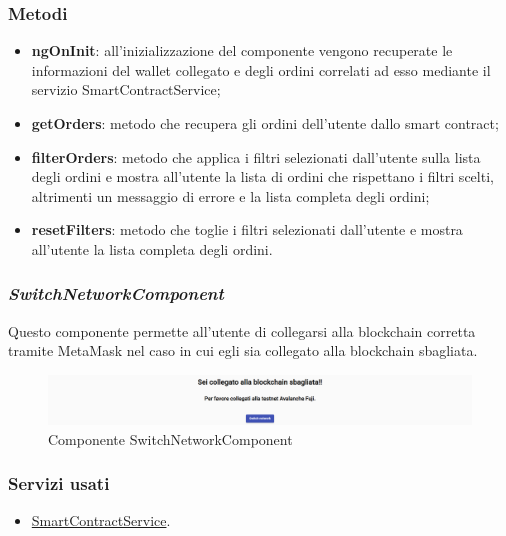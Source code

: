 \subsubsection{Metodi}
\begin{itemize}
    \item \textbf{ngOnInit}: all’inizializzazione del componente vengono recuperate le informazioni del wallet collegato e degli ordini correlati ad esso mediante il servizio SmartContractService;
    \item \textbf{getOrders}: metodo che recupera gli ordini dell'utente dallo smart contract;
    \item \textbf{filterOrders}: metodo che applica i filtri selezionati dall'utente sulla lista degli ordini e mostra all'utente la lista di ordini che rispettano i filtri scelti, altrimenti un messaggio di errore e la lista completa degli ordini;
    \item \textbf{resetFilters}: metodo che toglie i filtri selezionati dall'utente e mostra all'utente la lista completa degli ordini.
\end{itemize}

\newpage

\subsubsection*{\textit{SwitchNetworkComponent}}
\label{sec:switch-component}
Questo componente permette all'utente di collegarsi alla blockchain corretta tramite MetaMask nel caso in cui egli sia collegato alla blockchain sbagliata.

\begin{figure}[!h] 
    \centering 
    \includegraphics[width=1\columnwidth]{immagini/componenti/switchNetwork.png} 
    \caption{Componente SwitchNetworkComponent}
\end{figure}

\subsubsection{Servizi usati}
\begin{itemize}
    \item \hyperref[sec:smart-contract-service]{SmartContractService}.
\end{itemize}

